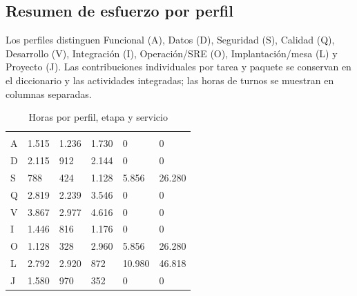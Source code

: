 \subsection{Resumen de esfuerzo por perfil}
Los perfiles distinguen Funcional (A), Datos (D), Seguridad (S), Calidad (Q), Desarrollo (V), Integración (I), Operación/SRE (O), Implantación/mesa (L) y Proyecto (J). Las contribuciones individuales por tarea y paquete se conservan en el diccionario y las actividades integradas; las horas de turnos se muestran en columnas separadas.
\begingroup\small\begin{longtable}{L{12mm}R{20mm}R{20mm}R{23mm}R{25mm}R{25mm}}
\caption{Horas por perfil, etapa y servicio}\label{tab:t15-perfiles}\\\hline
  &  &  &  &  & \\\hline\endfirsthead
\hline {} &  &  &  &  & \\\hline\endhead
A & 1.515 & 1.236 & 1.730 & 0 & 0\\\hline
D & 2.115 & 912 & 2.144 & 0 & 0\\\hline
S & 788 & 424 & 1.128 & 5.856 & 26.280\\\hline
Q & 2.819 & 2.239 & 3.546 & 0 & 0\\\hline
V & 3.867 & 2.977 & 4.616 & 0 & 0\\\hline
I & 1.446 & 816 & 1.176 & 0 & 0\\\hline
O & 1.128 & 328 & 2.960 & 5.856 & 26.280\\\hline
L & 2.792 & 2.920 & 872 & 10.980 & 46.818\\\hline
J & 1.580 & 970 & 352 & 0 & 0\\\hline
\end{longtable}\endgroup

